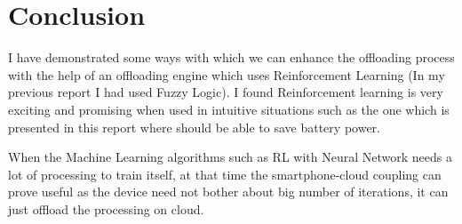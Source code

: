 \documentclass{article}
\begin{document}
\section{Conclusion}
I have demonstrated some ways with which we can enhance the offloading process with the help of an offloading engine which uses Reinforcement Learning (In my previous report I had used Fuzzy Logic). I found Reinforcement learning is very exciting and promising when used in intuitive situations such as the one which is presented in this report where should be able to save battery power. \par
When the Machine Learning algorithms such as RL with Neural Network needs a lot of processing to train itself, at that time the smartphone-cloud coupling can prove useful as the device need not bother about big number of iterations, it can just offload the processing on cloud. \cite{flores2013adaptive}



\end{document}
